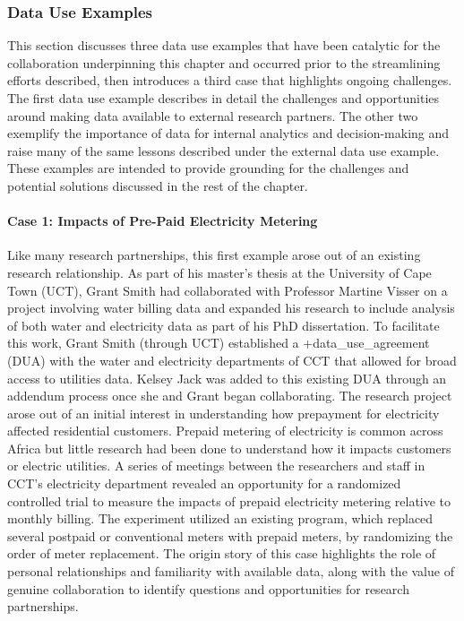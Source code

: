 \documentclass[
]{WileySix}
\begin{document}
\hypertarget{data-use-examples-6}{%
\subsubsection{Data Use Examples}\label{data-use-examples-6}}

This section discusses three data use examples that have been catalytic for the collaboration underpinning this chapter and occurred prior to the streamlining efforts described, then introduces a third case that highlights ongoing challenges. The first data use example describes in detail the challenges and opportunities around making data available to external research partners. The other two exemplify the importance of data for internal analytics and decision-making and raise many of the same lessons described under the external data use example. These examples are intended to provide grounding for the challenges and potential solutions discussed in the rest of the chapter.

\hypertarget{case-1-impacts-of-pre-paid-electricity-metering}{%
\paragraph{Case 1: Impacts of Pre-Paid Electricity Metering}\label{case-1-impacts-of-pre-paid-electricity-metering}}

Like many research partnerships, this first example arose out of an existing research relationship. As part of his master's thesis at the University of Cape Town (UCT), Grant Smith had collaborated with Professor Martine Visser on a project involving water billing data \citep{smith2014} and expanded his research to include analysis of both water and electricity data as part of his PhD dissertation. To facilitate this work, Grant Smith (through UCT) established a +data\_use\_agreement\textbar{} (DUA) with the water and electricity departments of CCT that allowed for broad access to utilities data. Kelsey Jack was added to this existing DUA through an addendum process once she and Grant began collaborating. The research project arose out of an initial interest in understanding how prepayment for electricity affected residential customers. Prepaid metering of electricity is common across Africa but little research had been done to understand how it impacts customers or electric utilities. A series of meetings between the researchers and staff in CCT's electricity department revealed an opportunity for a randomized controlled trial to measure the impacts of prepaid electricity metering relative to monthly billing. The experiment utilized an existing program, which replaced several postpaid or conventional meters with prepaid meters, by randomizing the order of meter replacement. The origin story of this case highlights the role of personal relationships and familiarity with available data, along with the value of genuine collaboration to identify questions and opportunities for research partnerships.
\end{document}
